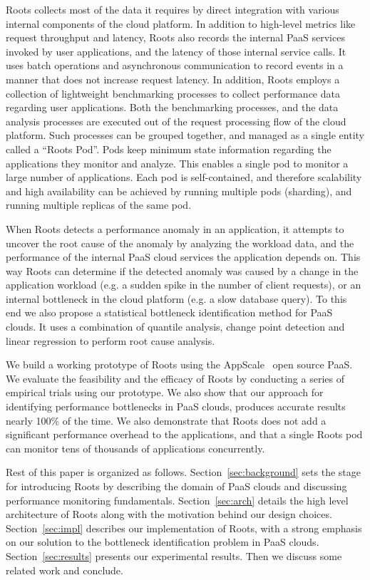 Roots collects most of the data it requires by direct integration with various internal components 
of the cloud platform. In addition to high-level metrics like request throughput
and latency, Roots also records the internal PaaS services invoked by user applications,
and the latency of those internal service calls. It uses batch operations and asynchronous 
communication to record events in a manner that does not increase request latency.
In addition, Roots employs a collection of lightweight  benchmarking
processes to collect performance data regarding user applications. Both
the benchmarking processes, and the data analysis processes are executed 
out of the request processing flow of the cloud platform. Such processes can be
grouped together, and managed as a single entity called a
``Roots Pod''. Pods keep minimum state
information regarding the applications they monitor and analyze. This enables
a single pod to monitor a large number of applications. Each pod is self-contained,
and therefore scalability and high availability can be achieved by running multiple pods (sharding),
and running multiple replicas of the same pod.

When Roots detects a performance anomaly in an application, it attempts to uncover the
root cause of the anomaly by analyzing the workload data,
and the performance of the internal PaaS cloud services the application depends on. 
This way Roots can determine if the detected anomaly was caused by a change in the
application workload (e.g. a sudden spike in the number of client requests), or an internal
bottleneck in the cloud platform (e.g. a slow database query). To this end we also propose
a statistical bottleneck identification method for PaaS clouds. 
It uses a combination of quantile analysis, change point detection
and linear regression to perform root cause analysis. 

We build a working prototype of 
Roots using the AppScale~\cite{6488671} open source PaaS. We evaluate the feasibility and the 
efficacy of Roots by conducting a series of empirical trials using our prototype. 
We also show that our approach for identifying performance bottlenecks
in PaaS clouds, produces accurate results nearly 100\% of the time. 
We also demonstrate that Roots does not add a significant performance overhead
to the applications, and that a single Roots pod can monitor tens of thousands
of applications concurrently.

Rest of this paper is organized as follows.
Section~\ref{sec:background} sets the stage for introducing Roots by describing the domain of 
PaaS clouds and discussing performance monitoring fundamentals. Section~\ref{sec:arch} 
details the high level architecture of Roots along with the motivation behind our design choices.
Section~\ref{sec:impl} describes our implementation of Roots, with a strong emphasis on our
solution to the bottleneck identification problem in PaaS clouds. Section~\ref{sec:results} presents our
experimental results. Then we discuss some related work and conclude. 
